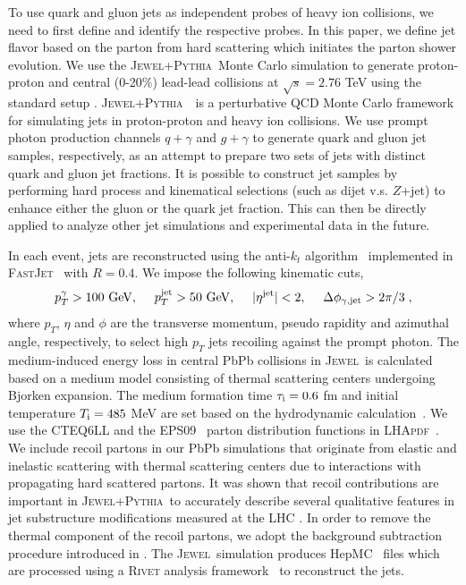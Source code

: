 \documentclass[notoc]{JHEP3}
\newcommand{\text}[1]{{\rm #1}}
\newcommand{\jw}{\textsc{Jewel}~}
\newcommand{\jwpy}{\textsc{Jewel+Pythia}~}
\begin{document}
To use quark and gluon jets as independent probes of heavy ion collisions, we need to first define and identify the respective probes. In this paper, we define jet flavor based on the parton from hard scattering which initiates the parton shower evolution. We use the \jwpy Monte Carlo simulation to generate proton-proton and central (0-20\%) lead-lead collisions at $\sqrt{s}=2.76$ TeV using the standard setup \cite{Zapp:2013zya}. \jwpy ~is a perturbative QCD Monte Carlo framework for simulating jets in proton-proton and heavy ion collisions. We use prompt photon production channels \cite{KunnawalkamElayavalli:2016ttl} $q +\gamma$ and $g +\gamma$ to generate quark and gluon jet samples, respectively, as an attempt to prepare two sets of jets with distinct quark and gluon jet fractions. It is possible to construct jet samples by performing hard process and kinematical selections (such as dijet v.s. $Z$+jet) to enhance either the gluon or the quark jet fraction. This can then be directly applied to analyze other jet simulations and experimental data in the future.

In each event, jets are reconstructed using the anti-$k_{t}$ algorithm~\cite{Cacciari:2008gp} implemented in \textsc{FastJet}~\cite{Cacciari:2011ma} with $R = 0.4$. We impose the following kinematic cuts,
\begin{equation}
    p^{\gamma}_T > 100~{\rm GeV}, ~~~~ p^{\rm jet}_T > 50~{\rm GeV}, ~~~~ |\eta^{\rm jet}|<2, ~~~~\Delta \phi_{\gamma, {\rm jet}} > 2\pi/3\;,
\end{equation}
where $p_T$, $\eta$ and $\phi$ are the transverse momentum, pseudo rapidity and azimuthal angle, respectively, to select high $p_T$ jets recoiling against the prompt photon. The medium-induced energy loss in central PbPb collisions in \jw is calculated based on a medium model consisting of thermal scattering centers undergoing Bjorken expansion. The medium formation time $\tau_\text{i}=0.6 $ fm and initial temperature $T_\text{i}=485$ MeV are set based on the hydrodynamic calculation~\cite{Shen:2012vn,Shen:2014vra}. We use the \textsc{CTEQ6LL} \cite{Pumplin:2002vw} and the \textsc{EPS09}~\cite{Eskola:2009uj} parton distribution functions in \textsc{LHApdf}~\cite{Whalley:2005nh}. We include recoil partons in our PbPb simulations that originate from elastic and inelastic scattering with thermal scattering centers due to interactions with propagating hard scattered partons. It was shown that recoil contributions are important in \jwpy to accurately describe several qualitative features in jet substructure modifications measured at the LHC \cite{KunnawalkamElayavalli:2017hxo,Milhano:2017nzm}. In order to remove the thermal component of the recoil partons, we adopt the background subtraction procedure introduced in \cite{KunnawalkamElayavalli:2017hxo,Milhano:2017nzm}. The \jw simulation produces HepMC~\cite{} files which are processed using a \textsc{Rivet} analysis framework~\cite{} to reconstruct the jets.
\end{document}
